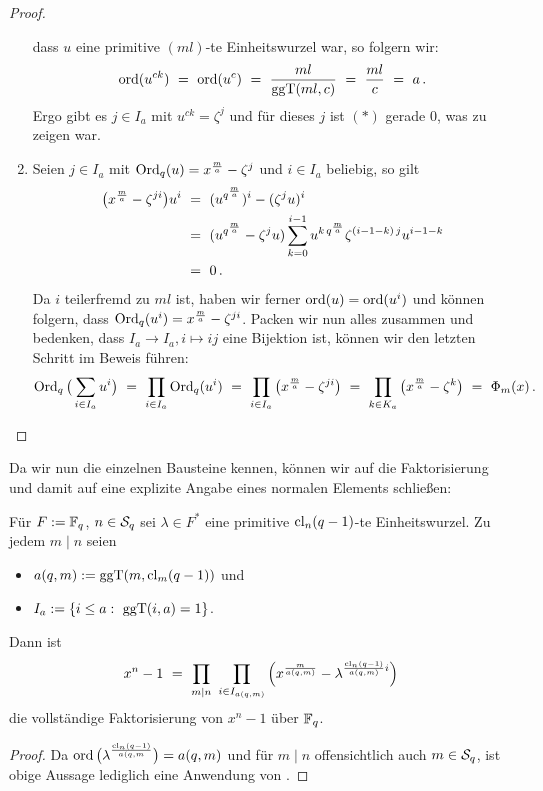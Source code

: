 \begin{proof}
\begin{enumerate}
    dass $u$ eine primitive $(ml)$-te Einheitswurzel war, so folgern wir:
    \[ \ord(u^{ck}) \speq= \ord(u^c) \speq= \frac{ml}{\ggT(ml,c)}
      \speq= \frac{ml}{c} \speq= a\,.\]
    Ergo gibt es $j\in I_a$ mit $u^{ck} = \zeta^j$ und für dieses $j$ ist
    $(\ast)$ gerade $0$, was zu zeigen war.
  \item Seien $j\in I_a$ mit $\Ord_q(u) = x^\frac m a - \zeta^j$ und 
    $i\in I_a$ beliebig, so gilt
    \begin{align*}
      \big( x^\frac m a - \zeta^{ji} \big) u^i \speq{&=}
      (u^{q^\frac m a})^i - (\zeta^ju)^i \\
      \speq{&=} (u^{q^\frac m a} - \zeta^ju) 
        \sum_{k=0}^{i-1} u^{k\,q^\frac m a} \zeta^{(i-1-k)\,j}u^{i-1-k} \\
        \speq{&=} 0\,.
    \end{align*}
    Da $i$ teilerfremd zu $ml$ ist, haben wir ferner $\ord(u) = \ord(u^i)$ und
    können folgern, dass $\Ord_q(u^i) = x^\frac m a - \zeta^{ji}$.
    Packen wir nun alles zusammen und bedenken, dass
    $I_a \to I_a, i\mapsto ij$ eine Bijektion ist, können wir den letzten
    Schritt im Beweis führen:
    \[ \Ord_q\big( \sum_{i\in I_a} u^i \big)
      \speq= \prod_{i\in I_a} \Ord_q(u^i) \speq=
      \prod_{i \in I_a} \big( x^\frac m a - \zeta^{ji} \big)
      \speq= \prod_{k\in K_a} \big(x^\frac m a - \zeta^k \big)
      \speq= \Phi_m(x)\,.\]
  \end{enumerate}
\end{proof}

Da wir nun die einzelnen Bausteine kennen, können wir auf die Faktorisierung
und damit auf eine explizite Angabe eines normalen Elements schließen:

\begin{kor}
  \label{kor:konstruktion-q-ordnung}
  Für $F := \F_q$, $n\in \S_q$ sei $\lambda \in F^\ast$ eine primitive 
  $\cl_n(q-1)$-te Einheitswurzel. Zu jedem $m \mid n$ seien
  \begin{itemize}
    \item $a(q,m) := \ggT(m,\cl_m(q-1))$ und
    \item $I_a := \{ i\leq a:\ \ggT(i,a) = 1\}$.
  \end{itemize}
  Dann ist
  \[ x^n-1 \speq= \prod_{m\mid n}\ \prod_{i\in I_{a(q,m)}} 
    \left( x^\frac{m}{a(q,m)} - \lambda^{\frac{\cl_n(q-1)}{a(q,m)} i}\right)\]
  die vollständige Faktorisierung von $x^n-1$ über $\F_q$.
\end{kor}
\begin{proof}
  Da  $\ord\big(\lambda^{\frac{\cl_n(q-1)}{a(q,m}}\big) = a(q,m)$
  und für $m\mid n$ offensichtlich auch $m\in \S_q$, ist obige Aussage lediglich
  eine Anwendung von .
\end{proof}

